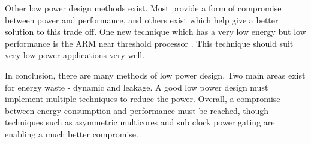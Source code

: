 Other low power design methods exist. 
Most provide a form of compromise between power and performance, and others exist which help give a better solution to this trade off. 
One new technique which has a very low energy but low performance is the ARM near threshold processor \cite{arm:nearthresh}. 
This technique should suit very low power applications very well. 

In conclusion, there are many methods of low power design. 
Two main areas exist for energy waste - dynamic and leakage. 
A good low power design must implement multiple techniques to reduce the power. 
Overall, a compromise between energy consumption and performance must be reached, though techniques such as asymmetric multicores and sub clock power gating are enabling a much better compromise.


